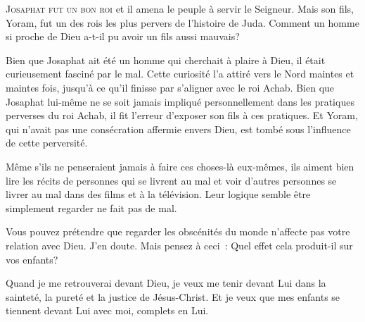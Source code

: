 \lettrine{J}{osaphat fut un bon roi} et il amena le peuple
 à servir le Seigneur. Mais son fils, Yoram, fut un des rois
 les plus pervers de l'histoire de Juda.
 Comment un homme si proche de Dieu a-t-il pu avoir un fils
 aussi mauvais? 

Bien que Josaphat ait été un homme qui cherchait à plaire à Dieu,
 il était curieusement fasciné par le mal.
 Cette curiosité l'a attiré vers le Nord maintes et maintes fois,
 jusqu'à ce qu'il finisse par s'aligner avec le roi Achab.
 Bien que Josaphat lui-même ne se soit jamais impliqué personnellement
 dans les pratiques perverses du roi Achab, il fit l'erreur d'exposer
 son fils à ces pratiques. Et Yoram, qui n'avait pas une consécration
 affermie envers Dieu, est tombé sous l'influence de cette perversité. 


Même s'ils ne penseraient jamais à faire ces choses-là eux-mêmes,
 ils aiment bien lire les récits de personnes qui se livrent au mal
 et voir d'autres personnes se livrer au mal dans des films
 et à la télévision. Leur logique semble être
 \og simplement regarder ne fait pas de mal. \fg{}

Vous pouvez prétendre que regarder les obscénités du monde n'affecte pas
 votre relation avec Dieu. J'en doute. Mais pensez à ceci~:
 Quel effet cela produit-il sur vos enfants? 

Quand je me retrouverai devant Dieu, je veux me tenir devant Lui
 dans la sainteté, la pureté et la justice de Jésus-Christ.
 Et je veux que mes enfants se tiennent devant Lui avec moi,
 complets en Lui. 

\dvrule



